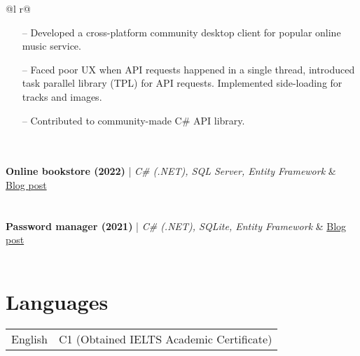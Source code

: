 \documentclass[a4paper,12pt]{article}
\begin{document}
\begin{tabularx}{\linewidth}{ @{}l r@{} }
{\begin{minipage}[t]{\linewidth}
    \begin{itemize}[nosep,after=\strut, leftmargin=1em, itemsep=3pt]
        \item[--] Developed a cross-platform community desktop client for popular online music service.
        \item [--] Faced poor UX when API requests happened in a single thread, introduced task parallel library (TPL) for API requests. Implemented side-loading for tracks and images.
        \item [--] Contributed to community-made C\# API library.
    \end{itemize}
    \end{minipage}
}  \\
\\
\textbf{Online bookstore (2022)} | \emph{C\# (.NET), SQL Server, Entity Framework} & \hfill \href{https://andude10.github.io/projects/SecurePass/}{Blog post} \\[3.75pt]
  \\
\\
\textbf{Password manager (2021)} | \emph{C\# (.NET), SQLite, Entity Framework} & \hfill \href{https://andude10.github.io/projects/SecurePass/}{Blog post} \\[3.75pt]
  \\
\end{tabularx}

\section{Languages}

\begin{tabularx}{\linewidth}{@{}l X@{}}
English  &  \normalsize{C1 (Obtained IELTS Academic Certificate)}\\
\end{tabularx}

\vfill
{}
\end{document}

